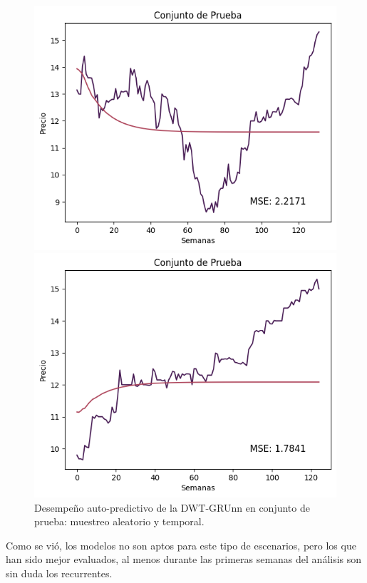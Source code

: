 \begin{figure}[H]
    \begin{minipage}{0.5\textwidth}
        \centering
        \includegraphics[width=\linewidth]{Figuras/proceso_de_entrenamiento/grafs_c_prueba/muestreo_aleatorio/DWT_GRU/auto_predictiva/DWT_GRU_rec.png}
    \end{minipage}
    \begin{minipage}{0.5\textwidth}
        \centering
        \includegraphics[width=\linewidth]{Figuras/proceso_de_entrenamiento/grafs_c_prueba/DWT_GRU/auto_predictiva/DWT_GRU_rec.png}
    \end{minipage}
    \caption{Desempeño auto-predictivo de la DWT-GRUnn en conjunto de prueba: muestreo aleatorio y temporal.} 
    \label{fig:c_prueba_DWTGRU_autopred_v2}
\end{figure}

Como se vió, los modelos no son aptos para este tipo de escenarios, pero los que han sido mejor evaluados, al menos durante las primeras semanas del análisis son sin duda los recurrentes.